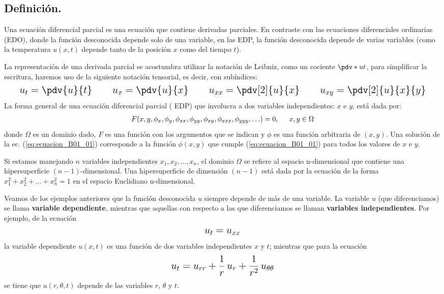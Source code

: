 \subsection*{Definición.}
Una ecuación diferencial parcial es una ecuación que contiene derivadas parciales. En contraste con las ecuaciones diferenciales ordinarias (EDO), donde la función desconocida depende solo de una variable, en las EDP, la función desconocida depende de varias variables (como la temperatura $u (x, t)$ depende tanto de la posición $x$ como del tiempo $t$).
\par
La representación de una derivada parcial se acostumbra utilizar la notación de Leibniz, como un cociente $\pdv*{u}{t}$, para simplificar la escritura, haremos uso de la siguiente notación tensorial, es decir, con subíndices:
\begin{align*}
\text{\Large{$
u_{t} = \pdv{u}{t} \hspace{1cm} u_{x} = \pdv{u}{x} \hspace{1cm} u_{xx} = \pdv[2]{u}{x} \hspace{1cm} u_{xy} = \pdv[2]{u}{x}{y}$}}
\end{align*}
La forma general de una ecuación diferencial parcial ( EDP) que involucra a dos variables independientes: $x$ e $y$, está dada por:
\begin{align}
F(x, y, \phi_{x}, \phi_{y}, \phi_{xx}, \phi_{yy}, \phi_{xy}, \phi_{xxx}, \phi_{yyy}, \ldots) = 0, \hspace{0.5cm} x, y \in \Omega
\label{eq:ecuacion_B01_01}
\end{align}
donde $\Omega$ es un dominio dado, $F$ es una función con los argumentos que se indican y $\phi$ es una función arbitraria de $(x, y)$. Una solución de la ec. (\ref{eq:ecuacion_B01_01}) corresponde a la función $\phi(x, y)$ que cumple (\ref{eq:ecuacion_B01_01}) para todos los valores de $x$ e $y$.
\par
Si estamos manejando $n$ variables independientes $x_{1}, x_{2}, \ldots, x_{n}$, el dominio $\Omega$ se refiere al espacio n-dimensional que contiene una hipersuperficie $(n-1)$-dimensional. Una hipersuperficie de dimensión $(n-1)$ está dada por la ecuación de la forma $x_{1}^{2} + x_{2}^{2} + \ldots + x_{n}^{2} = 1$ en el espacio Euclidiano n-dimensional.
\par
Veamos de los ejemplos anteriores que la función desconocida $u$ siempre depende de más de una variable. La variable $u$ (que diferenciamos) se llama \textbf{variable dependiente}, mientras que aquellas con respecto a las que diferenciamos se llaman \textbf{variables independientes}. Por ejemplo, de la ecuación
\begin{align*}
\text{\Large{$u_{t} = u_{xx}$}}
\end{align*}
la variable dependiente $u(x, t)$ es una función de dos variables independientes $x$ y $t$; mientras que para la ecuación
\begin{align*}
\text{\Large{$u_{t} = u_{rr} + \dfrac{1}{r} \, u_{r} + \dfrac{1}{r^{2}} \, u_{\theta \theta}$}}
\end{align*}
se tiene que $u(r, \theta, t)$ depende de las variables $r$, $\theta$ y $t$.
